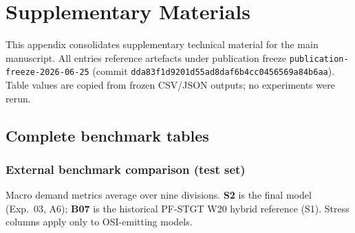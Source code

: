 \section{Supplementary Materials}\label{sec:supplementary_materials}

This appendix consolidates supplementary technical material for the main manuscript. All entries reference artefacts under publication freeze \texttt{publication-freeze-2026-06-25} (commit \texttt{dda83f1d9201d55ad8daf6b4cc0456569a84b6aa}). Table values are copied from frozen CSV/JSON outputs; no experiments were rerun.


\subsection{Complete benchmark tables}\label{subsection:complete_benchmark_tables}

\subsubsection{External benchmark comparison (test set)}\label{subsubsection:external_benchmark_comparison_test_set}

Macro demand metrics average over nine divisions. \textbf{S2} is the final model (Exp.~03, A6); \textbf{B07} is the historical PF-STGT W20 hybrid reference (S1). Stress columns apply only to OSI-emitting models.

\begin{center}
\scriptsize
{}
\end{center}

